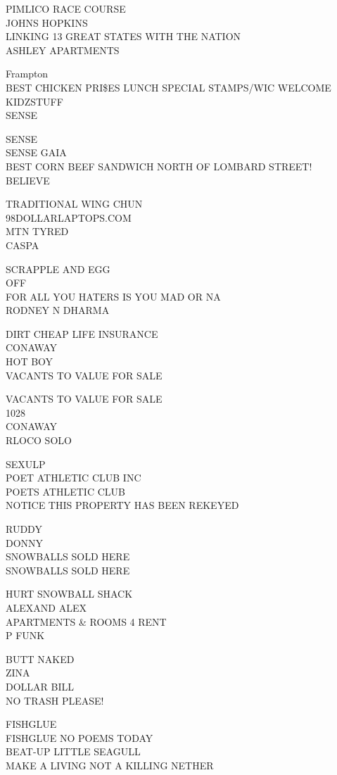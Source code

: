 \documentclass[10pt,letterpaper]{article}
\begin{document}
PIMLICO RACE COURSE\\
JOHNS HOPKINS\\
LINKING 13 GREAT STATES WITH THE NATION\\
ASHLEY APARTMENTS

Frampton\\
BEST CHICKEN PRI\$ES LUNCH SPECIAL STAMPS/WIC WELCOME\\
KIDZSTUFF\\
SENSE

SENSE\\
SENSE GAIA\\
BEST CORN BEEF SANDWICH NORTH OF LOMBARD STREET!\\
BELIEVE

TRADITIONAL WING CHUN\\
98DOLLARLAPTOPS.COM\\
MTN TYRED\\
CASPA

SCRAPPLE AND EGG\\
OFF\\
FOR ALL YOU HATERS IS YOU MAD OR NA\\
RODNEY N DHARMA

DIRT CHEAP LIFE INSURANCE\\
CONAWAY\\
HOT BOY\\
VACANTS TO VALUE FOR SALE

VACANTS TO VALUE FOR SALE\\
1028\\
CONAWAY\\
RLOCO SOLO

SEXULP\\
POET ATHLETIC CLUB INC\\
POETS ATHLETIC CLUB\\
NOTICE THIS PROPERTY HAS BEEN REKEYED

RUDDY\\
DONNY\\
SNOWBALLS SOLD HERE\\
SNOWBALLS SOLD HERE

HURT SNOWBALL SHACK\\
ALEXAND ALEX\\
APARTMENTS \& ROOMS 4 RENT\\
P FUNK

BUTT NAKED\\
ZINA\\
DOLLAR BILL\\
NO TRASH PLEASE!

FISHGLUE\\
FISHGLUE NO POEMS TODAY\\
BEAT{-}UP LITTLE SEAGULL\\
MAKE A LIVING NOT A KILLING NETHER
\end{document}
